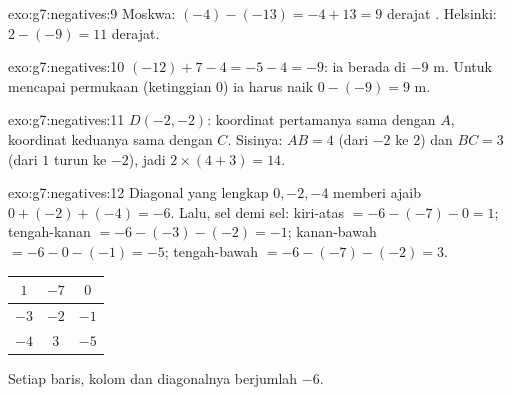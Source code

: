 \begin{solution}{exo:g7:negatives:9}
Moskwa: $(-4) - (-13) = -4 + 13 = 9$ derajat .
Helsinki: $2 - (-9) = 11$ derajat.
\end{solution}

\begin{solution}{exo:g7:negatives:10}
$(-12) + 7 - 4 = -5 - 4 = -9$: ia berada di $-9$ m. Untuk mencapai
permukaan (ketinggian $0$) ia harus naik $0 - (-9) = 9$ m.
\end{solution}

\begin{solution}{exo:g7:negatives:11}
$D(-2, -2)$: koordinat pertamanya sama dengan $A$, koordinat keduanya
sama dengan $C$. Sisinya: $AB = 4$ (dari $-2$ ke $2$) dan $BC = 3$
(dari $1$ turun ke $-2$), jadi  $2 \times (4 + 3) = 14$.
\end{solution}

\begin{solution}{exo:g7:negatives:12}
Diagonal yang lengkap $0, -2, -4$ memberi  ajaib
$0 + (-2) + (-4) = -6$. Lalu, sel demi sel:
kiri-atas $= -6 - (-7) - 0 = 1$; tengah-kanan $= -6 - (-3) - (-2) =
-1$; kanan-bawah $= -6 - 0 - (-1) = -5$; tengah-bawah
$= -6 - (-7) - (-2) = 3$.
\begin{center}
\renewcommand{\arraystretch}{1.4}
\begin{tabular}{|c|c|c|}
\hline
$1$ & $-7$ & $0$ \\
\hline
$-3$ & $-2$ & $-1$ \\
\hline
$-4$ & $3$ & $-5$ \\
\hline
\end{tabular}
\end{center}
Setiap baris, kolom dan diagonalnya berjumlah $-6$.
\end{solution}

